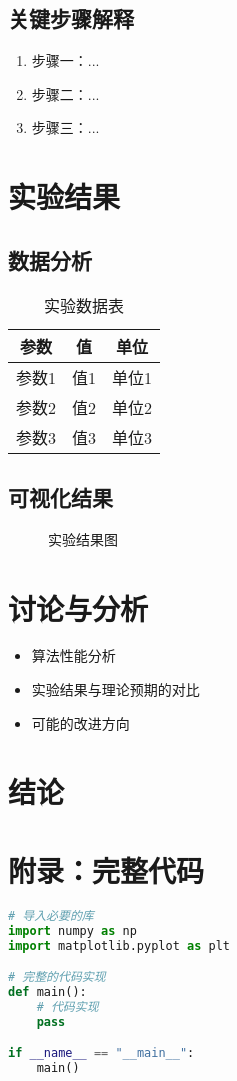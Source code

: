 \documentclass[letterpaper,12pt]{article}
\begin{document}
\subsection{关键步骤解释}
\begin{enumerate}[label=\arabic*., leftmargin=*]
    \item 步骤一：...
    \item 步骤二：...
    \item 步骤三：...
\end{enumerate}

\section{实验结果}

\subsection{数据分析}

\begin{table}[h]
    \centering
    \caption{实验数据表}
    \begin{tabular}{@{}ccc@{}}
    \toprule
    参数 & 值 & 单位 \\
    \midrule
    参数1 & 值1 & 单位1 \\
    参数2 & 值2 & 单位2 \\
    参数3 & 值3 & 单位3 \\
    \bottomrule
    \end{tabular}
\end{table}

\subsection{可视化结果}
\begin{figure}[h]
    \centering
    \caption{实验结果图}
    \label{fig:result}
\end{figure}

\section{讨论与分析}
\begin{itemize}
    \item 算法性能分析
    \item 实验结果与理论预期的对比
    \item 可能的改进方向
\end{itemize}

\section{结论}

\appendix %
\section{附录：完整代码}
\begin{lstlisting}[language=Python, caption=完整代码]
# 导入必要的库
import numpy as np
import matplotlib.pyplot as plt

# 完整的代码实现
def main():
    # 代码实现
    pass

if __name__ == "__main__":
    main()
\end{lstlisting}
\end{document}
